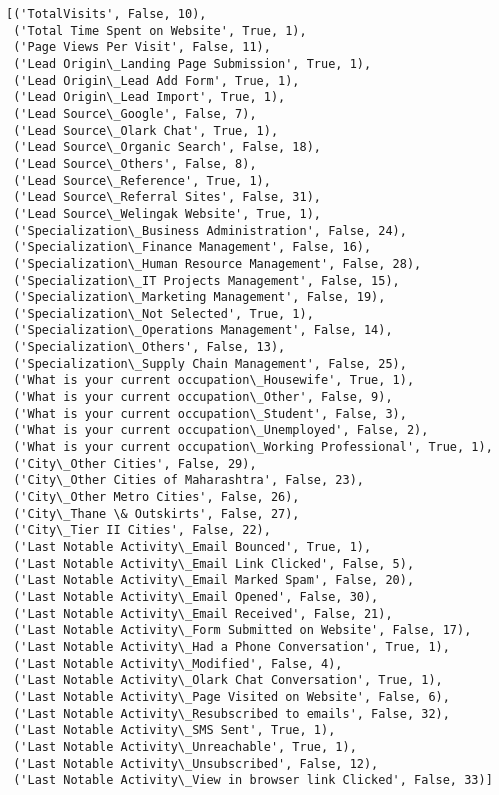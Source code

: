\documentclass[11pt]{article}
\makeatletter
\newcommand{\boxspacing}{\kern\kvtcb@left@rule\kern\kvtcb@boxsep}
\newcommand{\prompt}[4]{
        \ttfamily\llap{{\color{#2}[#3]:\hspace{3pt}#4}}\vspace{-\baselineskip}
    }
\makeatother
\begin{document}
            \begin{tcolorbox}[breakable, size=fbox, boxrule=.5pt, pad at break*=1mm, opacityfill=0]
\prompt{Out}{outcolor}{74}{\boxspacing}
\begin{Verbatim}[commandchars=\\\{\}]
[('TotalVisits', False, 10),
 ('Total Time Spent on Website', True, 1),
 ('Page Views Per Visit', False, 11),
 ('Lead Origin\_Landing Page Submission', True, 1),
 ('Lead Origin\_Lead Add Form', True, 1),
 ('Lead Origin\_Lead Import', True, 1),
 ('Lead Source\_Google', False, 7),
 ('Lead Source\_Olark Chat', True, 1),
 ('Lead Source\_Organic Search', False, 18),
 ('Lead Source\_Others', False, 8),
 ('Lead Source\_Reference', True, 1),
 ('Lead Source\_Referral Sites', False, 31),
 ('Lead Source\_Welingak Website', True, 1),
 ('Specialization\_Business Administration', False, 24),
 ('Specialization\_Finance Management', False, 16),
 ('Specialization\_Human Resource Management', False, 28),
 ('Specialization\_IT Projects Management', False, 15),
 ('Specialization\_Marketing Management', False, 19),
 ('Specialization\_Not Selected', True, 1),
 ('Specialization\_Operations Management', False, 14),
 ('Specialization\_Others', False, 13),
 ('Specialization\_Supply Chain Management', False, 25),
 ('What is your current occupation\_Housewife', True, 1),
 ('What is your current occupation\_Other', False, 9),
 ('What is your current occupation\_Student', False, 3),
 ('What is your current occupation\_Unemployed', False, 2),
 ('What is your current occupation\_Working Professional', True, 1),
 ('City\_Other Cities', False, 29),
 ('City\_Other Cities of Maharashtra', False, 23),
 ('City\_Other Metro Cities', False, 26),
 ('City\_Thane \& Outskirts', False, 27),
 ('City\_Tier II Cities', False, 22),
 ('Last Notable Activity\_Email Bounced', True, 1),
 ('Last Notable Activity\_Email Link Clicked', False, 5),
 ('Last Notable Activity\_Email Marked Spam', False, 20),
 ('Last Notable Activity\_Email Opened', False, 30),
 ('Last Notable Activity\_Email Received', False, 21),
 ('Last Notable Activity\_Form Submitted on Website', False, 17),
 ('Last Notable Activity\_Had a Phone Conversation', True, 1),
 ('Last Notable Activity\_Modified', False, 4),
 ('Last Notable Activity\_Olark Chat Conversation', True, 1),
 ('Last Notable Activity\_Page Visited on Website', False, 6),
 ('Last Notable Activity\_Resubscribed to emails', False, 32),
 ('Last Notable Activity\_SMS Sent', True, 1),
 ('Last Notable Activity\_Unreachable', True, 1),
 ('Last Notable Activity\_Unsubscribed', False, 12),
 ('Last Notable Activity\_View in browser link Clicked', False, 33)]
\end{Verbatim}
\end{tcolorbox}
        
\end{document}
